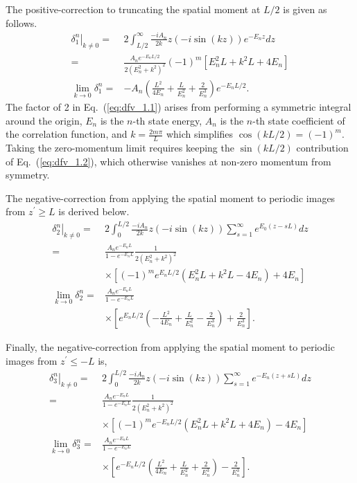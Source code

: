 \documentclass[prd,aps,twocolumn,superscriptaddress,tightenlines,nofootinbib,floatfix,preprintnumbers,10pt]{revtex4-1}
\begin{document}
The positive-correction to truncating the spatial moment at $L/2$ is given as follows.
\begin{align}
\left.\delta^n_{1}\right|_{k\neq 0}= & 2\int_{L/2}^{\infty} \frac{-iA_n}{2k} z(-i \sin(kz))e^{-E_n z} dz \label{eq:dfv_1.1}\\
=& \frac{A_n e^{-E_n L/2}}{2(E_n^2+k^2)^2}(-1)^m\left[E_n^2L+k^2L+4E_n\right] \label{eq:dfv_1.2}\\
\lim_{k\rightarrow 0}\delta^n_{1} =& -A_n\left(\frac{L^2}{4E_n}+\frac{L}{E_n^2}+\frac{2}{E_n^3}\right)e^{-E_n L/2}. \label{eq:dfv_1.0}
\end{align}
The factor of 2 in Eq.~(\ref{eq:dfv_1.1}) arises from performing a symmetric integral around the origin, $E_n$ is the $n$-th state energy, $A_n$ is the $n$-th state coefficient of the correlation function, and $k=\frac{2m\pi}{L}$ which simplifies $\cos(kL/2) = (-1)^m$. Taking the zero-momentum limit requires keeping the $\sin({kL/2})$ contribution of Eq.~(\ref{eq:dfv_1.2}), which otherwise vanishes at non-zero momentum from symmetry.

The negative-correction from applying the spatial moment to periodic images from $z^\prime \geq L$ is derived below. 
\begin{align}
\left.\delta^n_{2}\right|_{k\neq 0} =& 2\int_0^{L/2} \frac{-iA_n}{2k}z(-i\sin(kz)) \sum_{s=1}^\infty e^{E_0(z-sL)} dz \label{eq:dfv_2.1}\\
= & \frac{A_n e^{-E_n L}}{1-e^{-E_n L}}\frac{1}{2(E_n^2+k^2)^2}\nonumber\\
&\times\left[(-1)^m e^{E_n L/2}(E_n^2L+k^2L-4E_n) + 4E_n\right]\label{eq:dfv_2.2}\\
\lim_{k\rightarrow 0}\delta^n_2= & \frac{A_n e^{-E_n L}}{1-e^{-E_n L}}\nonumber\\
&\times\left[e^{E_n L/2} \left( -\frac{L^2}{4E_n} + \frac{L}{E_n^2} -\frac{2}{E_n^3} \right) + \frac{2}{E_n^3}\right].
\label{eq:dfv_2.0}
\end{align}

Finally, the negative-correction from applying the spatial moment to periodic images from $z^\prime \leq -L$ is,
\begin{align}
\left.\delta^n_{3}\right|_{k\neq 0}= & 2\int_{0}^{L/2}  \frac{-iA_n}{2k} z (-i\sin(kz)) \sum_{s=1}^\infty e^{-E_n(z+sL)} dz \label{eq:dfv_3.1}\\
=&\frac{A_n e^{-E_n L}}{1-e^{-E_n L}}\frac{1}{2(E_n^2+k^2)^2}\nonumber\\
&\times\left[(-1)^m e^{-E_n L/2}(E_n^2L+k^2L+4E_n) - 4E_n\right]\\
\lim_{k\rightarrow 0} \delta^n_3= & \frac{A_n e^{-E_n L}}{1-e^{-E_n L}}\nonumber\\
&\times \left[ e^{-E_n L/2}\left(\frac{L^2}{4E_n}+\frac{L}{E_n^2}+\frac{2}{E_n^3}\right)-\frac{2}{E_n^3}\right].
\label{eq:dfv_3.0}
\end{align}
\end{document}
